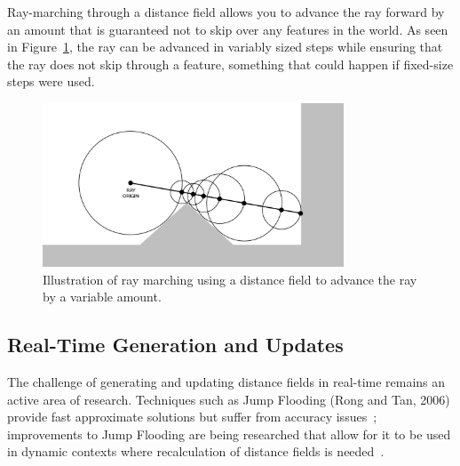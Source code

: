 Ray-marching through a distance field allows you to advance the ray forward by an amount that is guaranteed not to skip
over any features in the world. As seen in Figure~\ref{fig:distance_field_ray_march}, the ray can be advanced in variably
sized steps while ensuring that the ray does not skip through a feature, something that could happen if fixed-size steps
were used.

\begin{figure}[thp]
    \begin{center}
        \includegraphics[width=0.8\textwidth]{figures/ray_marching.png}
    \end{center}
    \caption{Illustration of ray marching using a distance field to advance the ray by a variable amount.}
    \label{fig:distance_field_ray_march}
\end{figure}

\subsection{Real-Time Generation and Updates}
The challenge of generating and updating distance fields in real-time remains an active area of research. Techniques
such as Jump Flooding (Rong and Tan, 2006) provide fast approximate solutions but suffer from accuracy
issues~\cite{rong2006jump,rong2007variants}; improvements to Jump Flooding are being researched that allow for it to
be used in dynamic contexts where recalculation of distance fields is needed~\cite{stevenson2022gpu}.
